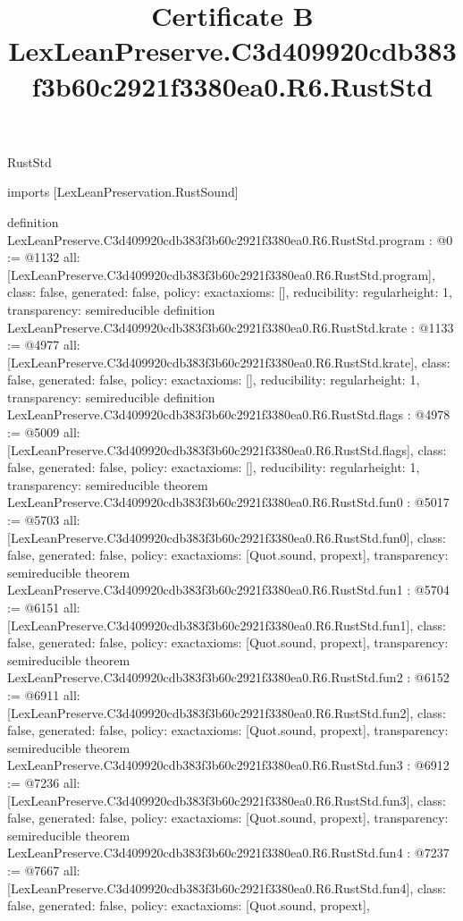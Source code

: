 \begin{lexlean}{RustStd}
\title{Certificate B LexLeanPreserve.C3d409920cdb383f3b60c2921f3380ea0.R6.RustStd}
\begin{coremodule}
imports [LexLeanPreservation.RustSound]

definition LexLeanPreserve.C3d409920cdb383f3b60c2921f3380ea0.R6.RustStd.program : @0 := @1132 {
  all: [LexLeanPreserve.C3d409920cdb383f3b60c2921f3380ea0.R6.RustStd.program],
  class: false,
  generated: false,
  policy: exact{axioms: []},
  reducibility: regular{height: 1},
  transparency: semireducible
}
definition LexLeanPreserve.C3d409920cdb383f3b60c2921f3380ea0.R6.RustStd.krate : @1133 := @4977 {
  all: [LexLeanPreserve.C3d409920cdb383f3b60c2921f3380ea0.R6.RustStd.krate],
  class: false,
  generated: false,
  policy: exact{axioms: []},
  reducibility: regular{height: 1},
  transparency: semireducible
}
definition LexLeanPreserve.C3d409920cdb383f3b60c2921f3380ea0.R6.RustStd.flags : @4978 := @5009 {
  all: [LexLeanPreserve.C3d409920cdb383f3b60c2921f3380ea0.R6.RustStd.flags],
  class: false,
  generated: false,
  policy: exact{axioms: []},
  reducibility: regular{height: 1},
  transparency: semireducible
}
theorem LexLeanPreserve.C3d409920cdb383f3b60c2921f3380ea0.R6.RustStd.fun0 : @5017 := @5703 {
  all: [LexLeanPreserve.C3d409920cdb383f3b60c2921f3380ea0.R6.RustStd.fun0],
  class: false,
  generated: false,
  policy: exact{axioms: [Quot.sound, propext]},
  transparency: semireducible
}
theorem LexLeanPreserve.C3d409920cdb383f3b60c2921f3380ea0.R6.RustStd.fun1 : @5704 := @6151 {
  all: [LexLeanPreserve.C3d409920cdb383f3b60c2921f3380ea0.R6.RustStd.fun1],
  class: false,
  generated: false,
  policy: exact{axioms: [Quot.sound, propext]},
  transparency: semireducible
}
theorem LexLeanPreserve.C3d409920cdb383f3b60c2921f3380ea0.R6.RustStd.fun2 : @6152 := @6911 {
  all: [LexLeanPreserve.C3d409920cdb383f3b60c2921f3380ea0.R6.RustStd.fun2],
  class: false,
  generated: false,
  policy: exact{axioms: [Quot.sound, propext]},
  transparency: semireducible
}
theorem LexLeanPreserve.C3d409920cdb383f3b60c2921f3380ea0.R6.RustStd.fun3 : @6912 := @7236 {
  all: [LexLeanPreserve.C3d409920cdb383f3b60c2921f3380ea0.R6.RustStd.fun3],
  class: false,
  generated: false,
  policy: exact{axioms: [Quot.sound, propext]},
  transparency: semireducible
}
theorem LexLeanPreserve.C3d409920cdb383f3b60c2921f3380ea0.R6.RustStd.fun4 : @7237 := @7667 {
  all: [LexLeanPreserve.C3d409920cdb383f3b60c2921f3380ea0.R6.RustStd.fun4],
  class: false,
  generated: false,
  policy: exact{axioms: [Quot.sound, propext]},
}
\end{coremodule}
\end{lexlean}
